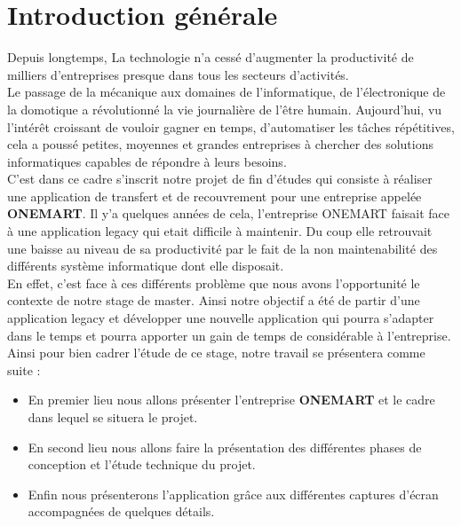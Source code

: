 \chapter*{Introduction générale}

Depuis longtemps, La technologie n'a cessé d'augmenter la productivité de milliers d'entreprises presque dans tous les secteurs d'activités.\\
Le passage de la mécanique aux domaines de l'informatique, de l'électronique de la domotique a révolutionné la vie journalière de l'être humain.
Aujourd'hui, vu l'intérêt croissant de vouloir gagner en temps, d'automatiser les tâches répétitives, cela a poussé petites, moyennes et grandes entreprises à chercher des solutions informatiques capables de répondre à leurs besoins.\\
C'est dans ce cadre s'inscrit notre projet de fin d'études qui consiste à réaliser une application de transfert et de recouvrement pour une entreprise appelée \textbf{ONEMART}.
Il y'a quelques années de cela, l'entreprise ONEMART faisait face à une application legacy qui etait difficile à maintenir. Du coup elle retrouvait une baisse au niveau de sa productivité par le fait de la non maintenabilité des différents système informatique dont elle disposait.\\
En effet, c'est face à ces différents problème que nous avons l'opportunité le contexte de notre stage de master. Ainsi notre objectif a été de partir d'une application legacy et développer une nouvelle application qui pourra s'adapter dans le temps et pourra apporter un gain de temps de considérable à l'entreprise.\\

Ainsi pour bien cadrer l'étude de ce stage, notre travail se présentera comme suite :\\
\begin{itemize}
	\item En premier lieu nous allons présenter l'entreprise \textbf{ONEMART} et le cadre dans lequel se situera le projet.
	\item En second lieu nous allons faire la présentation des différentes phases de conception et l'étude technique du projet.
	\item Enfin nous présenterons l'application grâce aux différentes captures d'écran accompagnées de quelques détails.
\end{itemize}